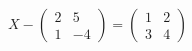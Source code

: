 \hspace*{2mm}\begin{minipage}[t]{\dimexpr\linewidth-2mm\relax}\vspace{0pt}
$X-\begin{pmatrix} 2 & 5 \\ 1 & -4 \end{pmatrix}=\begin{pmatrix} 1 & 2 \\ 3 & 4 \end{pmatrix}$\end{minipage}
